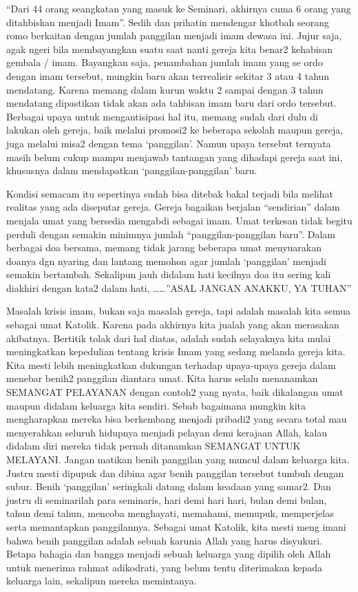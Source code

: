 
“Dari 44 orang seangkatan yang masuk ke Seminari, akhirnya cuma 6 orang yang ditahbiskan menjadi Imam”.
Sedih dan prihatin mendengar khotbah seorang romo berkaitan dengan jumlah panggilan menjadi imam dewasa ini.
Jujur saja, agak ngeri bila membayangkan suatu saat nanti gereja kita benar2 kehabisan gembala / imam. Bayangkan saja, penambahan jumlah imam yang se ordo dengan imam tersebut, mungkin baru akan terrealisir sekitar 3 atau 4 tahun mendatang. Karena memang dalam kurun waktu 2 sampai dengan 3 tahun mendatang dipastikan tidak akan ada tahbisan imam baru dari ordo tersebut.
Berbagai upaya untuk mengantisipasi hal itu, memang sudah dari dulu di lakukan oleh gereja, baik melalui promosi2 ke beberapa sekolah maupun gereja, juga melalui misa2 dengan tema ‘panggilan’. Namun upaya tersebut ternyata masih belum cukup mampu menjawab tantangan yang dihadapi gereja saat ini, khususnya dalam mendapatkan ‘panggilan-panggilan’ baru.

Kondisi semacam itu sepertinya sudah bisa ditebak bakal terjadi bila melihat realitas yang ada diseputar gereja. Gereja bagaikan berjalan “sendirian” dalam menjala umat yang bersedia mengabdi sebagai imam. Umat terkesan tidak begitu perduli dengan semakin minimnya jumlah “panggilan-panggilan baru”.
Dalam berbagai doa bersama, memang tidak jarang beberapa umat menyuarakan doanya dgn nyaring dan lantang memohon agar jumlah ‘panggilan’ menjadi semakin bertambah. Sekalipun jauh didalam hati kecilnya doa itu sering kali diakhiri dengan kata2 dalam hati, ……”ASAL JANGAN ANAKKU, YA TUHAN”

Masalah krisis imam, bukan saja masalah gereja, tapi adalah masalah kita semua sebagai umat Katolik. Karena pada akhirnya kita jualah yang akan merasakan akibatnya.
Bertitik tolak dari hal diatas, adalah sudah selayaknya kita mulai meningkatkan kepedulian tentang krisis Imam yang sedang melanda gereja kita. Kita mesti lebih meningkatkan dukungan terhadap upaya-upaya gereja dalam menebar benih2 panggilan diantara umat. Kita harus selalu menanamkan SEMANGAT PELAYANAN dengan contoh2 yang nyata, baik dikalangan umat maupun didalam keluarga kita sendiri. Sebab bagaimana mungkin kita mengharapkan mereka bisa berkembang menjadi pribadi2 yang secara total mau menyerahkan seluruh hidupnya menjadi pelayan demi kerajaan Allah, kalau didalam diri mereka tidak pernah ditanamkan SEMANGAT UNTUK MELAYANI. Jangan matikan benih panggilan yang muncul dalam keluarga kita. Justru mesti dipupuk dan dibina agar benih panggilan tersebut tumbuh dengan subur.
Benih ‘panggilan’ seringkali datang dalam keadaan yang samar2. Dan justru di seminarilah para seminaris, hari demi hari hari, bulan demi bulan, tahun demi tahun, mencoba menghayati, memahami, memupuk, memperjelas serta memantapkan panggilannya.
Sebagai umat Katolik, kita mesti meng imani bahwa benih panggilan adalah sebuah karunia Allah yang harus disyukuri. Betapa bahagia dan bangga menjadi sebuah keluarga yang dipilih oleh Allah untuk menerima rahmat adikodrati, yang belum tentu diterimakan kepada keluarga lain, sekalipun mereka memintanya.

